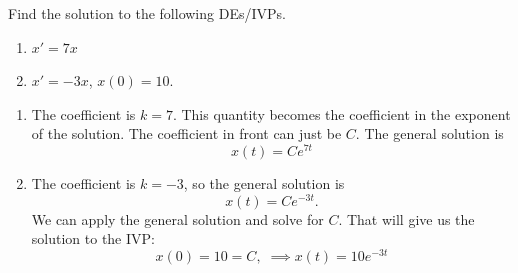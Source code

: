 \documentclass[10pt,letterpaper]{article}
\begin{document}
\begin{example}[2]{
Find the solution to the following DEs/IVPs. 
\begin{enumerate}
    \item[a)] $x'=7x$
    \item[b)] $x' = -3x$, $x(0)=10$.
\end{enumerate}
}
\begin{enumerate}
    \item[a)]
    The coefficient is $k=7$. This quantity becomes the coefficient in the exponent of the solution. The coefficient in front can just be $C$. The general solution is 
    $$
    \boxed{
        x(t) = C e^{7t}
    }
    $$
    \item[b)]
    The coefficient is $k=-3$, so the general solution is 
    $$
        x(t) = C e^{-3t}.
    $$
    We can apply the general solution and solve for $C$. That will give us the solution to the IVP:
    $$
        x(0)=10 =C, \;\implies \boxed{x(t)= 10e^{-3t}}
    $$
\end{enumerate}
\end{example}

\end{document}
